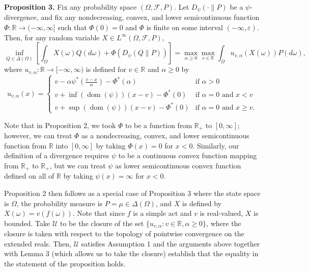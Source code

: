 \documentclass[12pt,a4paper]{article}
\newenvironment{original}
  {\par\noindent\color{black}\smallskip}
  {\par\smallskip}
\begin{document}
\begin{original}
\textbf{Proposition 3.} Fix any probability space $(\Omega, \mathcal{F}, P)$. Let $D_\psi(\cdot\|P)$ be a $\psi$-divergence, and fix any nondecreasing, convex, and lower semicontinuous function $\Phi: \mathbb{R} \to (-\infty, \infty]$ such that $\Phi(0) = 0$ and $\Phi$ is finite on some interval $(-\infty, \varepsilon)$. Then, for any random variable $X \in L^\infty(\Omega, \mathcal{F}, P)$,
\[
\inf_{Q \in \Delta(\Omega)} \left[ \int_\Omega X(\omega) Q(d\omega) + \Phi(D_\psi(Q\|P)) \right] = \max_{\alpha \geq 0} \max_{v \in \mathbb{R}} \int_\Omega u_{v,\alpha}(X(\omega)) P(d\omega),
\]
where $u_{v,\alpha}: \mathbb{R} \to [-\infty, \infty)$ is defined for $v \in \mathbb{R}$ and $\alpha \geq 0$ by
\[
u_{v,\alpha}(x) = \begin{cases}
v - \alpha \psi^*\left( \frac{v - x}{\alpha} \right) - \Phi^*(\alpha) & \text{if } \alpha > 0 \\
v + \inf(\operatorname{dom}(\psi)) (x - v) - \Phi^*(0) & \text{if } \alpha = 0 \text{ and } x < v \\
v + \sup(\operatorname{dom}(\psi)) (x - v) - \Phi^*(0) & \text{if } \alpha = 0 \text{ and } x \geq v.
\end{cases}
\]

Note that in Proposition 2, we took $\Phi$ to be a function from $\mathbb{R}_+$ to $[0, \infty]$; however, we can treat $\Phi$ as a nondecreasing, convex, and lower semicontinuous function from $\mathbb{R}$ into $[0, \infty]$ by taking $\Phi(x) = 0$ for $x < 0$. Similarly, our definition of a divergence requires $\psi$ to be a continuous convex function mapping from $\mathbb{R}_+$ to $\mathbb{R}_+$, but we can treat $\psi$ as lower semicontinuous convex function defined on all of $\mathbb{R}$ by taking $\psi(x) = \infty$ for $x < 0$.

Proposition 2 then follows as a special case of Proposition 3 where the state space is $\Omega$, the probability measure is $P = \mu \in \Delta(\Omega)$, and $X$ is defined by $X(\omega) = v(f(\omega))$. Note that since $f$ is a simple act and $v$ is real-valued, $X$ is bounded. Take $\mathcal{U}$ to be the closure of the set $\{ u_{v,\alpha} : v \in \mathbb{R}, \alpha \geq 0 \}$, where the closure is taken with respect to the topology of pointwise convergence on the extended reals. Then, $\mathcal{U}$ satisfies Assumption 1 and the arguments above together with Lemma 3 (which allows us to take the closure) establish that the equality in the statement of the proposition holds.
\end{original}
\end{document}
